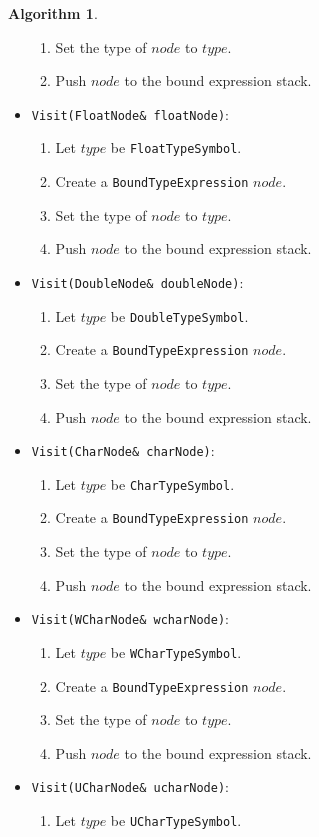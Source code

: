 \documentclass[a4paper,oneside,11pt]{book}
\theoremstyle{definition}
\newtheorem{algo}{Algorithm}[section]
\begin{document}
\begin{algo}
\begin{itemize}
\begin{enumerate}
\item
Set the type of $node$ to $type$.
\item
Push $node$ to the bound expression stack.
\end{enumerate}
\item
\verb|Visit(FloatNode& floatNode)|:
\begin{enumerate}
\item
Let $type$ be \verb|FloatTypeSymbol|.
\item
Create a \verb|BoundTypeExpression| $node$.
\item
Set the type of $node$ to $type$.
\item
Push $node$ to the bound expression stack.
\end{enumerate}
\item
\verb|Visit(DoubleNode& doubleNode)|:
\begin{enumerate}
\item
Let $type$ be \verb|DoubleTypeSymbol|.
\item
Create a \verb|BoundTypeExpression| $node$.
\item
Set the type of $node$ to $type$.
\item
Push $node$ to the bound expression stack.
\end{enumerate}
\item
\verb|Visit(CharNode& charNode)|:
\begin{enumerate}
\item
Let $type$ be \verb|CharTypeSymbol|.
\item
Create a \verb|BoundTypeExpression| $node$.
\item
Set the type of $node$ to $type$.
\item
Push $node$ to the bound expression stack.
\end{enumerate}
\item
\verb|Visit(WCharNode& wcharNode)|:
\begin{enumerate}
\item
Let $type$ be \verb|WCharTypeSymbol|.
\item
Create a \verb|BoundTypeExpression| $node$.
\item
Set the type of $node$ to $type$.
\item
Push $node$ to the bound expression stack.
\end{enumerate}
\item
\verb|Visit(UCharNode& ucharNode)|:
\begin{enumerate}
\item
Let $type$ be \verb|UCharTypeSymbol|.

\end{enumerate}
\end{itemize}
\end{algo}
\end{document}
